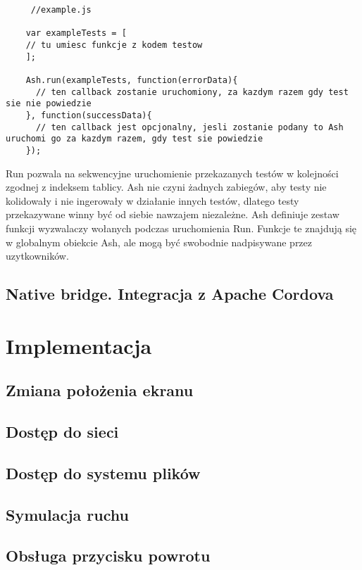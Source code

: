 \documentclass[a4paper]{article}
\begin{document}
\begin{lstlisting}
     //example.js

    var exampleTests = [
	// tu umiesc funkcje z kodem testow
    ];

    Ash.run(exampleTests, function(errorData){
      // ten callback zostanie uruchomiony, za kazdym razem gdy test sie nie powiedzie
    }, function(successData){
      // ten callback jest opcjonalny, jesli zostanie podany to Ash uruchomi go za kazdym razem, gdy test sie powiedzie
    });
\end{lstlisting}

Run pozwala na sekwencyjne uruchomienie przekazanych testów w kolejności zgodnej z indeksem tablicy. Ash nie czyni żadnych zabiegów, aby testy nie kolidowały i nie ingerowały w działanie innych testów, dlatego testy przekazywane winny być od siebie nawzajem niezależne. Ash definiuje zestaw funkcji wyzwalaczy wołanych podczas uruchomienia Run. Funkcje te znajdują się w globalnym obiekcie Ash, ale mogą być swobodnie nadpisywane przez uzytkowników.  

\subsection{Native bridge. Integracja z Apache Cordova}

\section{Implementacja}

\subsection{Zmiana położenia ekranu}

\subsection{Dostęp do sieci}

\subsection{Dostęp do systemu plików}

\subsection{Symulacja ruchu}

\subsection{Obsługa przycisku powrotu}
\end{document}
